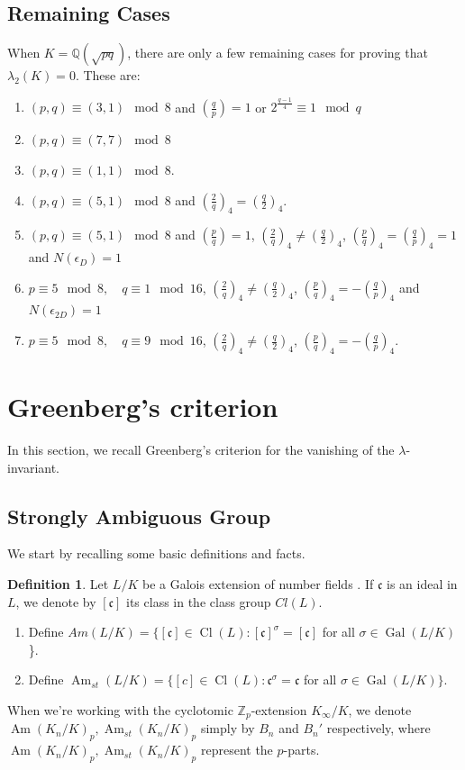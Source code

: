\documentclass{article}
\numberwithin{equation}{section}
\theoremstyle{plain}  %
\theoremstyle{definition}
\newtheorem{definition}{Definition}[section]
\newcommand{\Z}{\mathbb{Z}}
\newcommand{\Q}{\mathbb{Q}}
\newcommand{\paren}[1]{\left( #1 \right)}
\DeclareMathOperator{\Gal}{Gal}
\DeclareMathOperator{\Cl}{Cl}
\DeclareMathOperator{\Am}{Am}
\newcommand{\Amst}{\Am_{st}}
\newcommand{\mfc}{\mathfrak c}
\begin{document}
\subsection{Remaining Cases}
When $K= \Q(\sqrt{pq})$, there are only a few remaining cases for proving that $\lambda_2(K)=0$. These are:

\begin{enumerate}
    \item $(p,q)\equiv(3,1) \mod 8$ and $\paren{\frac{q}{p}}=1$ or $2^{\frac{q-1}{4}}\equiv 1 \mod q$ 
    \item $(p,q) \equiv (7,7) \mod 8$
    \item $(p,q)\equiv(1,1) \mod{8}$.
    \item $(p,q) \equiv (5,1) \mod 8$ and $\paren{\frac{2}{q}}_4= \paren{\frac{q}{2}}_4$.
    \item $(p,q) \equiv (5,1) \mod 8$ and $\paren{\frac pq}=1$, $\paren{\frac{2}{q}}_4 \neq \paren{\frac{q}{2}}_4$, $\paren{\frac{p}{q}}_4= \paren{\frac{q}{p}}_4=1$ and    $N(\epsilon_D)=1$
    \item $p \equiv 5 \mod 8, \quad q \equiv 1 \mod 16$, $\paren{\frac{2}{q}}_4 \neq \paren{\frac{q}{2}}_4$, $\paren{\frac{p}{q}}_4= -\paren{\frac{q}{p}}_4$  and $N(\epsilon_{2D})=1$
    \item $p \equiv 5 \mod 8, \quad q \equiv 9 \mod 16$, $\paren{\frac{2}{q}}_4 \neq \paren{\frac{q}{2}}_4$,  $\paren{\frac{p}{q}}_4= -\paren{\frac{q}{p}}_4$.
    
\end{enumerate}

\section{Greenberg's criterion}
In this section, we recall Greenberg's criterion for the vanishing of the $\lambda$- invariant. 
\subsection{Strongly Ambiguous Group}
We start by recalling some basic definitions and facts.
\begin{definition}
Let $L/K$ be a Galois extension of number fields . If $\mfc$ is an ideal in $L$, we denote by $[\mfc]$ its class in the class group $Cl(L)$.
    \begin{enumerate}
        \item Define $Am(L/K)=\{[\mfc] \in \Cl(L): [\mfc]^\sigma = [\mfc]$ for all $\sigma \in \Gal(L/K)$ \}.
        \item Define $\Amst(L/K) = \{ [c] \in \Cl(L): \mfc^\sigma=\mfc$ for all $\sigma \in \Gal(L/K) \}$.
    \end{enumerate}
\end{definition}
When we're working with the cyclotomic $\Z_p$-extension $K_\infty/K$, we denote $\Am(K_n/K)_p, \Amst(K_n/K)_p$ simply by $B_n$ and $B_n'$ respectively, where $\Am(K_n/K)_p, \Amst(K_n/K)_p$ represent the $p$-parts.\\
\end{document}

